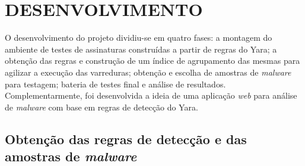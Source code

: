 \chapter{DESENVOLVIMENTO}
\label{c.Desenvolvimento}

O desenvolvimento do projeto dividiu-se em quatro fases: a montagem do ambiente
de testes de assinaturas construídas a partir de regras do Yara; a obtenção das
regras e construção de um índice de agrupamento das mesmas para agilizar a
execução das varreduras; obtenção e escolha de amostras de \textit{malware} para
testagem; bateria de testes final e análise de resultados. Complementarmente,
foi desenvolvida a ideia de uma aplicação \textit{web} para análise de
\textit{malware} com base em regras de detecção do Yara.

\section{Obtenção das regras de detecção e das amostras de \textit{malware}}
\label{s.obtregras}

